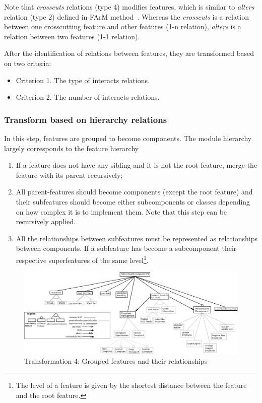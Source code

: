 \documentclass[11pt,twoside]{article}
\begin{document}
Note that \textit{crosscuts} relations (type 4) modifies features, which is similar to \textit{alters} relation (type 2) defined in FArM
method~\cite{Sochos:2006:FAM}. Whereas the \textit{crosscuts} is a relation between one
crosscutting feature and other features (1-n relation), \textit{alters} is a relation between two features (1-1 relation).

After the identification of relations between features, they are transformed based on two criteria:
\begin{itemize}
\item Criterion 1. The type of interacts relations.
\item Criterion 2. The number of interacts relations.
\end{itemize}


\subsubsection{Transform based on hierarchy relations}
\label{sec:transfHierRel}
In this step, features are grouped to become components. 
The module hierarchy largely corresponds to the feature hierarchy~\cite{Kang:1998:FFR}

\begin{enumerate}
\item If a feature does not have any sibling and it is not the root feature, merge the feature with its parent recursively;
\item All parent-features should become components (except the root feature) and their subfeatures should become either subcomponents or
classes depending on how complex it is to implement them. Note that this step can be recursively applied.
\item All the relationships between subfeatures must be represented as relationships between components. If a subfeature has become a
subcomponent  their respective superfeatures of the same level\footnote{The
level of a feature is given by the shortest distance between the feature and the root feature.}.
\end{enumerate}




\begin{figure}[h!t!b!]
   \centering
    \includegraphics[scale=0.23]{figs/phs-farm-step4-v04.png}
   \caption{Transformation 4: Grouped features and their relationships}
   \label{fig:groupedFeat}
\end{figure}
\end{document}
